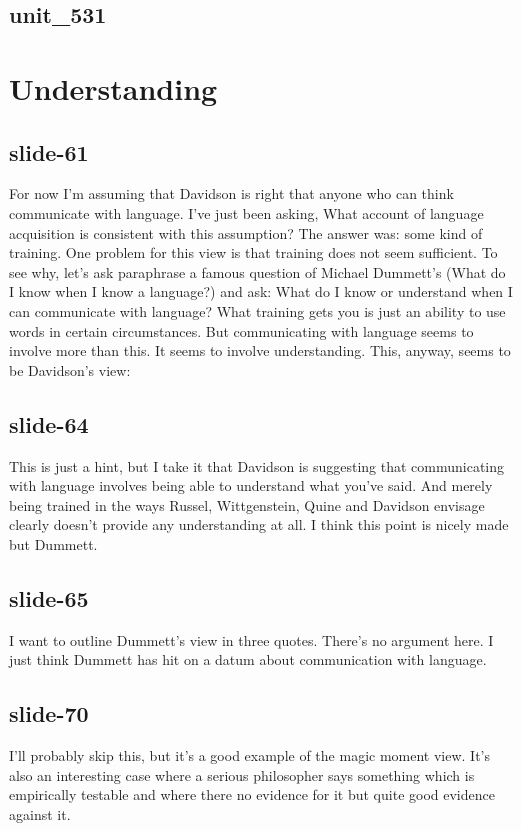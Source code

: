 \documentclass[12pt,\papersize]{extarticle}
\begin{document}
 
\subsection{unit\_531}
 
\section{Understanding}
 
 
\subsection{slide-61}
For now I'm assuming that Davidson is right that anyone who can think communicate with language.
I've just been asking, What account of language acquisition is consistent with this assumption?
The answer was: some kind of training.
One problem for this view is that training does not seem sufficient.
To see why, let's ask paraphrase a famous question of Michael Dummett's (What do I know when I know a language?) and ask:
What do I know or understand when I can communicate with language?
What training gets you is just an ability to use words in certain circumstances.
But communicating with language seems to involve more than this.
It seems to involve understanding.
This, anyway, seems to be Davidson's view:
 
 
\subsection{slide-64}
This is just a hint, but I take it that Davidson is suggesting that communicating with language involves being able to understand what you've said.
And merely being trained in the ways Russel, Wittgenstein, Quine and Davidson envisage clearly doesn't provide any understanding at all.
I think this point is nicely made but Dummett.
 
 
\subsection{slide-65}
I want to outline Dummett's view in three quotes.
There's no argument here. I just think Dummett has hit on a datum about communication with language.
 
 
\subsection{slide-70}
I'll probably skip this, but it's a good example of the magic moment view.
It's also an interesting case where a serious philosopher says something which is empirically testable and where there no evidence for it but quite good evidence against it.
 
\end{document}
